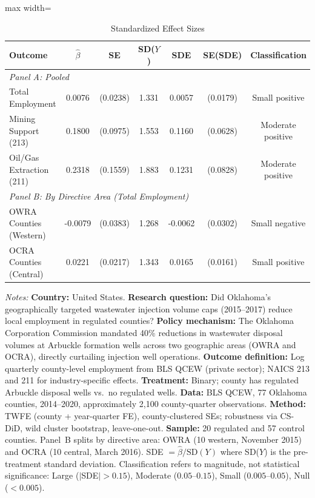\begin{table}[htbp]
\centering
\caption{Standardized Effect Sizes}
\label{tab:sde}
\begin{threeparttable}
\begin{adjustbox}{max width=\textwidth}
\begin{tabular}{lcccccc}
\toprule
Outcome & $\hat{\beta}$ & SE & SD($Y$) & SDE & SE(SDE) & Classification \\
\midrule
\multicolumn{7}{l}{\textit{Panel A: Pooled}} \\
Total Employment & 0.0076 & (0.0238) & 1.331 & 0.0057 & (0.0179) & Small positive \\
Mining Support (213) & 0.1800 & (0.0975) & 1.553 & 0.1160 & (0.0628) & Moderate positive \\
Oil/Gas Extraction (211) & 0.2318 & (0.1559) & 1.883 & 0.1231 & (0.0828) & Moderate positive \\
\midrule
\multicolumn{7}{l}{\textit{Panel B: By Directive Area (Total Employment)}} \\
OWRA Counties (Western) & -0.0079 & (0.0383) & 1.268 & -0.0062 & (0.0302) & Small negative \\
OCRA Counties (Central) & 0.0221 & (0.0217) & 1.343 & 0.0165 & (0.0161) & Small positive \\
\bottomrule
\end{tabular}
\end{adjustbox}
\end{threeparttable}
\par\vspace{0.5em}
\parbox{\textwidth}{\footnotesize
\item \textit{Notes:}
\textbf{Country:} United States.
\textbf{Research question:} Did Oklahoma's geographically targeted wastewater injection volume caps (2015--2017) reduce local employment in regulated counties?
\textbf{Policy mechanism:} The Oklahoma Corporation Commission mandated 40\% reductions in wastewater disposal volumes at Arbuckle formation wells across two geographic areas (OWRA and OCRA), directly curtailing injection well operations.
\textbf{Outcome definition:} Log quarterly county-level employment from BLS QCEW (private sector); NAICS 213 and 211 for industry-specific effects.
\textbf{Treatment:} Binary; county has regulated Arbuckle disposal wells vs.\ no regulated wells.
\textbf{Data:} BLS QCEW, 77 Oklahoma counties, 2014--2020, approximately 2,100 county-quarter observations.
\textbf{Method:} TWFE (county + year-quarter FE), county-clustered SEs; robustness via CS-DiD, wild cluster bootstrap, leave-one-out.
\textbf{Sample:} 20 regulated and 57 control counties. Panel~B splits by directive area: OWRA (10 western, November 2015) and OCRA (10 central, March 2016).
SDE $= \hat{\beta} / \text{SD}(Y)$ where SD($Y$) is the pre-treatment standard deviation. Classification refers to magnitude, not statistical significance: Large ($|$SDE$| > 0.15$), Moderate ($0.05$--$0.15$), Small ($0.005$--$0.05$), Null ($< 0.005$).
}
\end{table}

